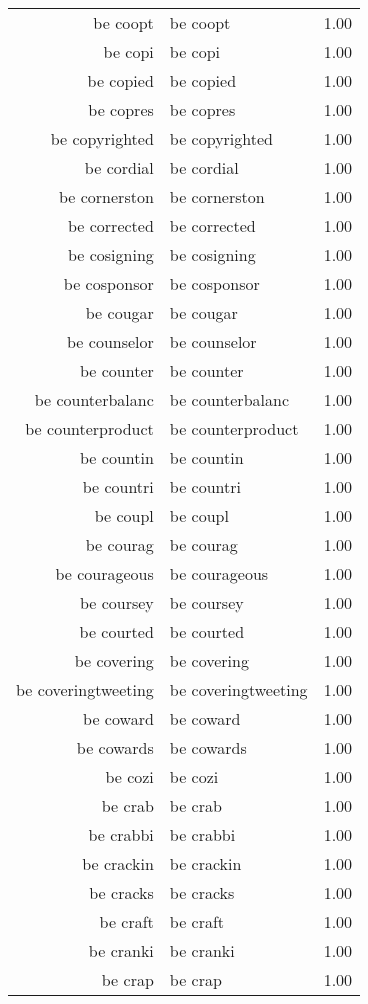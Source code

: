 \begin{table}[ht]
\begin{tabular}{rlr}
  be coopt & be coopt & 1.00 \\ 
  be copi & be copi & 1.00 \\ 
  be copied & be copied & 1.00 \\ 
  be copres & be copres & 1.00 \\ 
  be copyrighted & be copyrighted & 1.00 \\ 
  be cordial & be cordial & 1.00 \\ 
  be cornerston & be cornerston & 1.00 \\ 
  be corrected & be corrected & 1.00 \\ 
  be cosigning & be cosigning & 1.00 \\ 
  be cosponsor & be cosponsor & 1.00 \\ 
  be cougar & be cougar & 1.00 \\ 
  be counselor & be counselor & 1.00 \\ 
  be counter & be counter & 1.00 \\ 
  be counterbalanc & be counterbalanc & 1.00 \\ 
  be counterproduct & be counterproduct & 1.00 \\ 
  be countin & be countin & 1.00 \\ 
  be countri & be countri & 1.00 \\ 
  be coupl & be coupl & 1.00 \\ 
  be courag & be courag & 1.00 \\ 
  be courageous & be courageous & 1.00 \\ 
  be coursey & be coursey & 1.00 \\ 
  be courted & be courted & 1.00 \\ 
  be covering & be covering & 1.00 \\ 
  be coveringtweeting & be coveringtweeting & 1.00 \\ 
  be coward & be coward & 1.00 \\ 
  be cowards & be cowards & 1.00 \\ 
  be cozi & be cozi & 1.00 \\ 
  be crab & be crab & 1.00 \\ 
  be crabbi & be crabbi & 1.00 \\ 
  be crackin & be crackin & 1.00 \\ 
  be cracks & be cracks & 1.00 \\ 
  be craft & be craft & 1.00 \\ 
  be cranki & be cranki & 1.00 \\ 
  be crap & be crap & 1.00 \\ 

\end{tabular}
\end{table}
